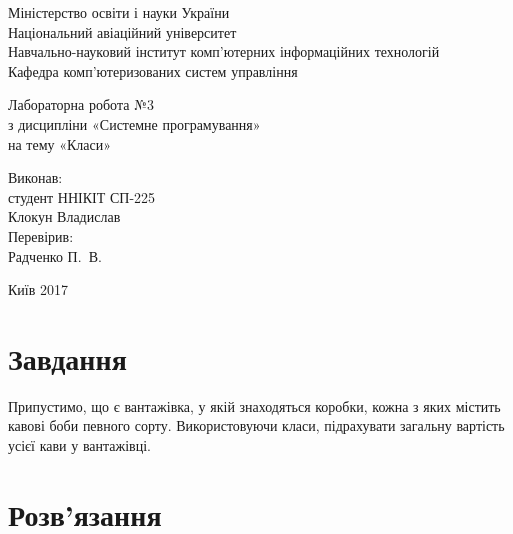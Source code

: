 \documentclass[a4paper,oneside,DIV=12,12pt]{scrartcl}
\begin{document}
	\begin{titlepage}
    \begin{center}
	Міністерство освіти і науки України\\
	Національний авіаційний університет\\
	Навчально-науковий інститут комп'ютерних інформаційних технологій\\
	Кафедра комп'ютеризованих систем управління

	\vspace{\fill}

	Лабораторна робота №3\\
	з дисципліни «Системне програмування»\\
	на тему «Класи»

	\vspace{\fill}
	
	\begin{flushright}
				Виконав:\\
				студент ННІКІТ СП-225\\
				Клокун Владислав\\
				Перевірив:\\
				Радченко П.~В.
	\end{flushright}

	Київ 2017

    \end{center}
    \end{titlepage}
	
	\section{Завдання}
		Припустимо, що є вантажівка, у якій знаходяться коробки, кожна з яких містить кавові боби певного сорту. Використовуючи класи, підрахувати загальну вартість усієї кави у вантажівці.
		
	\section{Розв'язання}
		
\end{document}
